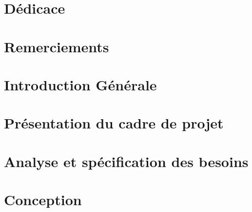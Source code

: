 \documentclass[12pt,a4paper]{report}
\begin{document}



\cleardoublepage
\chapter*{Dédicace}


\cleardoublepage
\chapter*{Remerciements}


\cleardoublepage
\tableofcontents

\cleardoublepage
\listoffigures

\cleardoublepage
\listoftables

\cleardoublepage
{}

\cleardoublepage
\chapter*{Introduction Générale}


\cleardoublepage
\chapter{Présentation du cadre de projet}


\cleardoublepage
\chapter{Analyse et spécification des besoins}


\cleardoublepage
\chapter{Conception}


\cleardoublepage
\end{document}
